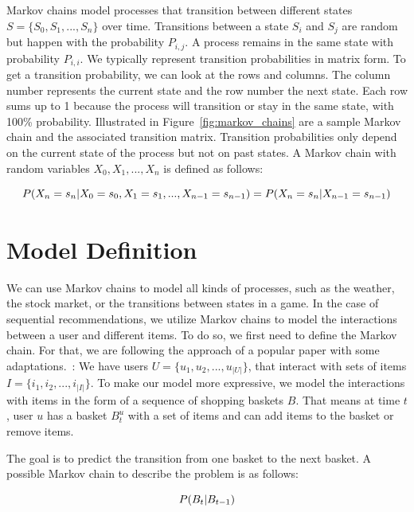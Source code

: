 Markov chains model processes that transition between different states $S=\{S_0, S_1, ..., S_n\}$ over time. Transitions between a state $S_i$ and $S_j$ are random but happen with the probability $P_{i,j}$. A process remains in the same state with probability $P_{i,i}$. We typically represent transition probabilities in matrix form. To get a transition probability, we can look at the rows and columns. The column number represents the current state and the row number the next state. Each row sums up to 1 because the process will transition or stay in the same state, with 100\% probability. Illustrated in Figure~\ref{fig:markov_chains} are a sample Markov chain and the associated transition matrix. Transition probabilities only depend on the current state of the process but not on past states. A Markov chain with random variables $X_0, X_1, ..., X_n$ is defined as follows:

\begin{equation}
\setlength{\jot}{25pt}
    P(X_n=s_n|X_0=s_0,X_1=s_1,...,X_{n-1}=s_{n-1})=P(X_n=s_n|X_{n-1}=s_{n-1})
    \label{equation:markov_chain}
\end{equation}



\section{Model Definition}
We can use Markov chains to model all kinds of processes, such as the weather, the stock market, or the transitions between states in a game. In the case of sequential recommendations, we utilize Markov chains to model the interactions between a user and different items. To do so, we first need to define the Markov chain. For that, we are following the approach of a popular paper with some adaptations.~\cite{rendlefactorizing}: We have users $U=\{u_1,u_2,...,u_{|U|}\}$, that interact with sets of items $I=\{i_1,i_2,...,i_{|I|}\}$. To make our model more expressive, we model the interactions with items in the form of a sequence of shopping baskets $B$. That means at time $t$, user $u$ has a basket $B^u_t$ with a set of items and can add items to the basket or remove items. 

The goal is to predict the transition from one basket to the next basket. A possible Markov chain to describe the problem is as follows:

\begin{equation}
\setlength{\jot}{25pt}
    P(B_t|B_{t-1})
    \label{equation:sample_markov_chain}
\end{equation}

